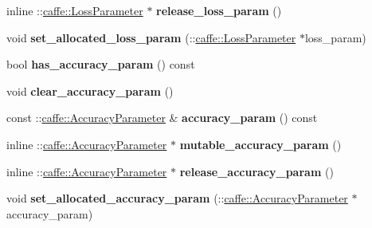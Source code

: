 \begin{DoxyCompactItemize}
\item 
\mbox{\label{classcaffe_1_1_layer_parameter_a0b13eedc79fc8bf6a0b53f741252c6a2}} 
inline \+::\mbox{\hyperlink{classcaffe_1_1_loss_parameter}{caffe\+::\+Loss\+Parameter}} $\ast$ {\bfseries release\+\_\+loss\+\_\+param} ()
\item 
\mbox{\label{classcaffe_1_1_layer_parameter_a262366794f09d511e72b77f1a646c638}} 
void {\bfseries set\+\_\+allocated\+\_\+loss\+\_\+param} (\+::\mbox{\hyperlink{classcaffe_1_1_loss_parameter}{caffe\+::\+Loss\+Parameter}} $\ast$loss\+\_\+param)
\item 
\mbox{\label{classcaffe_1_1_layer_parameter_a5e686131c73d2d8ddaaad4cc244728f0}} 
bool {\bfseries has\+\_\+accuracy\+\_\+param} () const
\item 
\mbox{\label{classcaffe_1_1_layer_parameter_af791fd1900df08eacd11bb872da776e1}} 
void {\bfseries clear\+\_\+accuracy\+\_\+param} ()
\item 
\mbox{\label{classcaffe_1_1_layer_parameter_ad0f6ff4a6bf942675a9b62463a2d8a18}} 
const \+::\mbox{\hyperlink{classcaffe_1_1_accuracy_parameter}{caffe\+::\+Accuracy\+Parameter}} \& {\bfseries accuracy\+\_\+param} () const
\item 
\mbox{\label{classcaffe_1_1_layer_parameter_aa520c821fc5decf0600e12428c5bdec1}} 
inline \+::\mbox{\hyperlink{classcaffe_1_1_accuracy_parameter}{caffe\+::\+Accuracy\+Parameter}} $\ast$ {\bfseries mutable\+\_\+accuracy\+\_\+param} ()
\item 
\mbox{\label{classcaffe_1_1_layer_parameter_a26fcb2947965ed63d867bea1641389d3}} 
inline \+::\mbox{\hyperlink{classcaffe_1_1_accuracy_parameter}{caffe\+::\+Accuracy\+Parameter}} $\ast$ {\bfseries release\+\_\+accuracy\+\_\+param} ()
\item 
\mbox{\label{classcaffe_1_1_layer_parameter_a848c1ef02dad46102c808b7d4beca68f}} 
void {\bfseries set\+\_\+allocated\+\_\+accuracy\+\_\+param} (\+::\mbox{\hyperlink{classcaffe_1_1_accuracy_parameter}{caffe\+::\+Accuracy\+Parameter}} $\ast$accuracy\+\_\+param)

\end{DoxyCompactItemize}
